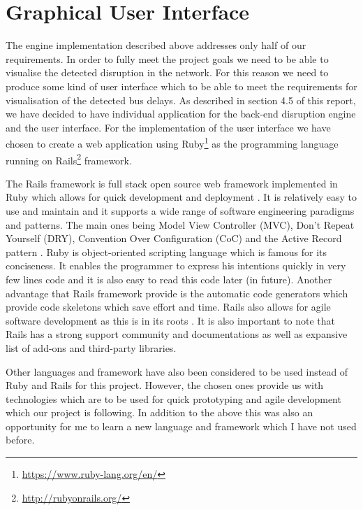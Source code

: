 \FloatBarrier
\section{Graphical User Interface}
The engine implementation described above addresses only half of our requirements. In order to fully meet the project goals we need to be able to visualise the detected disruption in the network. For this reason we need to produce some kind of user interface which to be able to meet the requirements for visualisation of the detected bus delays. As described in section 4.5 of this report, we have decided to have individual application for the back-end disruption engine and the user interface. For the implementation of the user interface we have chosen to create a web application using Ruby\footnote{\url{https://www.ruby-lang.org/en/}} as the programming language running on Rails\footnote{\url{http://rubyonrails.org/}} framework.

The Rails framework is full stack open source web framework implemented in Ruby which allows for quick development and deployment \cite{guide2006agile}. It is relatively easy to use and maintain and it supports a wide range of software engineering paradigms and patterns. The main ones being Model View Controller (MVC), Don't Repeat Yourself (DRY), Convention Over Configuration (CoC) and the Active Record pattern \cite{fowler2003patterns}. Ruby is object-oriented scripting language which is famous for its conciseness. It enables the programmer to express his intentions quickly in very few lines code and it is also easy to read this code later (in future). Another advantage that Rails framework provide is the automatic code generators which provide code skeletons which save effort and time. Rails also allows for agile software development as this is in its roots \cite{guide2006agile}. It is also important to note that Rails has a strong support community and documentations as well as expansive list of add-ons and third-party libraries.

Other languages and framework have also been considered to be used instead of Ruby and Rails for this project. However, the chosen ones provide us with technologies which are to be used for quick prototyping and agile development which our project is following. In addition to the above this was also an opportunity for me to learn a new language and framework which I have not used before.


